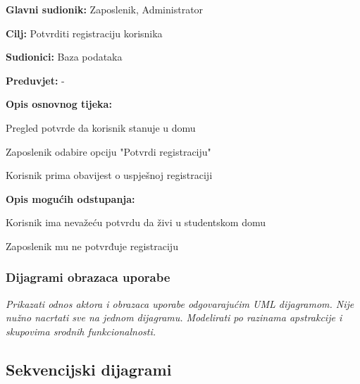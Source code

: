 \begin{packed_item}
	
	\item \textbf{Glavni sudionik: }Zaposlenik, Administrator
	\item  \textbf{Cilj:} Potvrditi registraciju korisnika
	\item  \textbf{Sudionici:} Baza podataka
	\item  \textbf{Preduvjet:} -
	\item  \textbf{Opis osnovnog tijeka:}
	
	\item[] \begin{packed_enum}
		
		\item Pregled potvrde da korisnik stanuje u domu
		\item Zaposlenik odabire opciju "Potvrdi registraciju"
		\item Korisnik prima obavijest o uspješnoj registraciji
		
	\end{packed_enum}
	\item  \textbf{Opis mogućih odstupanja:}
	
	\item[] \begin{packed_item}
		
		\item[1.a] Korisnik ima nevažeću potvrdu da živi u studentskom   domu 
		\item[] \begin{packed_enum}
			
			\item Zaposlenik mu ne potvrđuje registraciju
			
		\end{packed_enum}
		
		
	\end{packed_item}
\end{packed_item}

\subsubsection{Dijagrami obrazaca uporabe}

\textit{Prikazati odnos aktora i obrazaca uporabe odgovarajućim UML dijagramom. Nije nužno nacrtati sve na jednom dijagramu. Modelirati po razinama apstrakcije i skupovima srodnih funkcionalnosti.}
\eject		

\subsection{Sekvencijski dijagrami}

